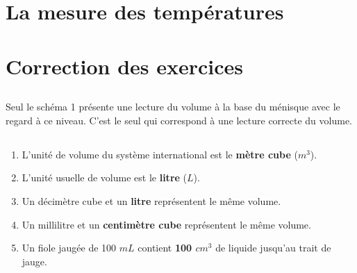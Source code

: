 \documentclass[12pt,a4paper]{article}
\begin{document}
\section{La mesure des températures}








\begin{myexos}
\end{myexos}
\appendix

\newpage

\section*{Correction des exercices}

\subsection*{}

Seul le schéma 1 présente une lecture du volume à la base du ménisque avec le regard à ce niveau. C'est le seul qui correspond à une lecture correcte du volume.

\subsection*{}

\begin{enumerate}[label=\alph*)]
	\item L'unité de volume du système international est le \textbf{mètre cube} ($m^3$).
	\item L'unité usuelle de volume est le \textbf{litre} ($L$).
	\item Un décimètre cube et un \textbf{litre} représentent le même volume.
	\item Un millilitre et un \textbf{centimètre cube} représentent le même volume.
	\item Un fiole jaugée de 100 $mL$ contient \textbf{100 $cm^3$} de liquide jusqu'au trait de jauge.
\end{enumerate}

\subsection*{}
\end{document}
